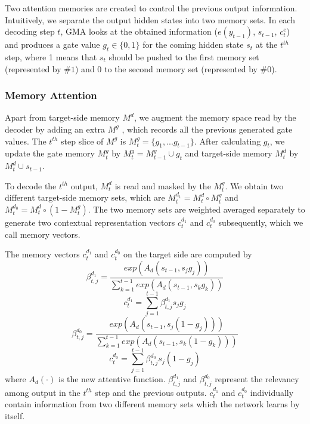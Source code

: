 \documentclass[letterpaper]{article} %
\begin{document}
Two attention memories are created to control the previous output information.
Intuitively, we separate the output hidden states into two memory sets. 
In each decoding step $t$, GMA looks at the obtained information ($e(y_{t-1})$, ${s}_{t-1}$, $c^e_t$) and produces a gate value $g_t \in \{0,1\}$ for the coming hidden state $s_{t}$ at the $t^{th}$ step, where 1 means that $s_{t}$ should be pushed to the first memory set (represented by \#$1$) and 0 to the second memory set (represented by \#$0$).

\subsubsection{Memory Attention}

Apart from target-side memory $M^d$, we augment the memory space read by the decoder by adding an extra $M^g$ , which records all the previous generated gate values.
The $t^{th}$ step slice of $M^g$ is $M^g_t=\{g_1,...g_{t-1}\}$.
 After calculating $g_t$, we update the gate memory ${M^g_t}$ by ${M^g_{t}= M^g_{t-1}\cup {g_t}} $ and target-side memory $M^d_t$ by $M^d_{t} \cup {{s}_{t-1}} $.

To decode the $t^{th}$ output, $M^d_t$ is read and masked by the $M^g_t$. We obtain two different target-side memory sets, which are $M^{d_1}_t = M^d_t \circ  M^g_t$ and $M^{d_0}_t = M^d_t \circ (1- M^g_t)$. The two memory sets are weighted averaged separately to generate two contextual representation vectors $c^{d_{1}}_t$ and $c^{d_0}_t$ subsequently, which we call memory vectors.

The memory vectors $c^{d_1}_t$ and $c^{d_0}_t$ on the target side are computed by
\begin{equation}
\label{equ:attentin weight a}
\beta_{t,j}^{d_1} = \frac {exp(A_d(s_{t-1},{s_j}{g_j}))}{\sum_{k=1}^{t-1}{exp(A_d(s_{t-1},{s_k}{g_k}))}}
\end{equation}
\begin{equation}
\label{equ:attentin weight c}
{c^{d_1}_t} = {\sum_{j=1}^{t-1}{\beta_{t,j}^{d_1}}{s_j}{g_j}}
\end{equation}
\begin{equation}
\label{equ:attentin weight b}
\beta_{t,j}^{d_0} = \frac{exp(A_d(s_{t-1},{s_j}{(1-g_j)}))}{\sum_{k=1}^{t-1}{exp(A_d(s_{t-1},{s_k}{(1-g_k)}))}}
\end{equation}
\begin{equation}
\label{equ:attentin weight d}
{c^{d_0}_t} = {\sum_{j=1}^{t-1}{\beta_{t,j}^{d_0}}{s_j}{(1- {g_j})}}
\end{equation}
where $A_d(\cdot)$ is the new attentive function. ${\beta}^{d_1}_{t,j}$ and ${\beta}^{d_0}_{t,j}$ represent the relevancy among output in the $t^{th}$ step and the previous outputs. $c^{d_{1}}_t$ and $c^{d_0}_t$ individually contain information from two different memory sets which the network learns by itself.
\end{document}
